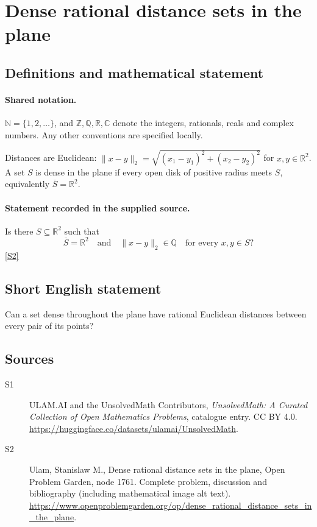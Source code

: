 \documentclass[11pt]{book}
\newcommand{\sref}[2]{\hyperlink{source:#1:#2}{[S#2]}}
\begin{document}
\section{Dense rational distance sets in the plane}\label{statement}

\subsection{Definitions and mathematical statement}

\paragraph{Shared notation.}$\mathbb N=\{1,2,\ldots\}$, and $\mathbb Z,\mathbb Q,\mathbb R,\mathbb C$ denote the integers, rationals, reals and complex numbers. Any other conventions are specified locally.


Distances are Euclidean: $\|x-y\|_2=\sqrt{(x_1-y_1)^2+(x_2-y_2)^2}$ for $x,y\in\mathbb R^2$. A set $S$ is dense in the plane if every open disk of positive radius meets $S$, equivalently $\overline S=\mathbb R^2$.
\paragraph{Statement recorded in the supplied source.}
Is there $S\subseteq\mathbb R^2$ such that
\[\overline S=\mathbb R^2\quad\text{and}\quad\|x-y\|_2\in\mathbb Q\quad\text{for every }x,y\in S?\] \sref{statement}{2}
\subsection{Short English statement}
Can a set dense throughout the plane have rational Euclidean distances between every pair of its points?
\subsection{Sources}
\begin{description}
\item[\hypertarget{source:statement:1}{S1}] ULAM.AI and the UnsolvedMath Contributors, \emph{UnsolvedMath: A Curated Collection of Open Mathematics Problems}, catalogue entry. CC BY 4.0. \url{https://huggingface.co/datasets/ulamai/UnsolvedMath}.
\item[\hypertarget{source:statement:2}{S2}] Ulam, Stanislaw M., Dense rational distance sets in the plane, Open Problem Garden, node 1761. Complete problem, discussion and bibliography (including mathematical image alt text). \url{https://www.openproblemgarden.org/op/dense_rational_distance_sets_in_the_plane}.
\end{description}
\label{end:statement}
\end{document}

